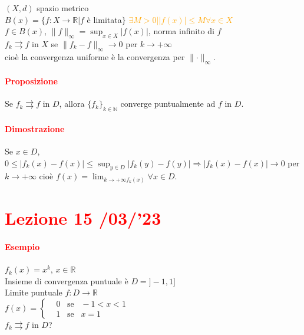 \documentclass{article}
\newcommand{\R}{\mathbb{R}}
\newcommand{\N}{\mathbb{N}}
\begin{document}
$(X,d)$ spazio metrico\\
$B(x)=\{f:X \rightarrow \R | f$ è limitata$\}$ \textcolor{orange}{$\exists M >0 | |f(x)| \leq M \forall x \in X$}\\
$f\in B(x)$, $\parallel f \parallel_\infty =\sup_{x\in X}|f(x)|$, norma infinito di $f$\\
$f_k \rightrightarrows f$ in $X$ se $\parallel f_k - f \parallel_\infty \rightarrow 0$ per $k \rightarrow +\infty$\\
cioè la convergenza uniforme è la convergenza per $\parallel \cdot \parallel_\infty$.

\paragraph{\textcolor{red}{Proposizione}}
Se $f_k \rightrightarrows f$ in $ D $, allora $\{ f_k \}_{k \in \N}$ converge puntualmente ad $f$ in $D$.

\paragraph{\textcolor{red}{Dimostrazione}}
Se $x \in D$, $0 \leq |f_k(x) -f(x)| \leq \sup_{y\in D}|f_k(y)-f(y)| \Rightarrow |f_k(x)-f(x)|\rightarrow 0$ per $ k \rightarrow +\infty$ cioè $f(x)=\lim_{k \rightarrow +\infty f_k (x)} \forall x \in D$.
\begin{flushright}
\large\Lightning
\end{flushright}

\newpage
\section{\textcolor{red}{Lezione 15 \space{}/03/'23}}
\paragraph{\textcolor{red}{Esempio}}
$f_k(x)=x^k$, $x \in \R$\\
Insieme di convergenza puntuale è $D=]-1,1]$\\
Limite puntuale $f:D \rightarrow \R$\\
$f (x)= \begin{cases}
    & 0 \,\,\,\,\, \text{se} \,\,\,\,\, -1 < x<1\\
    & 1 \,\,\,\,\, \text{se} \,\,\,\,\, x=1
\end{cases}$\\
$f_k \rightrightarrows f$ in $D$?\\
\end{document}
